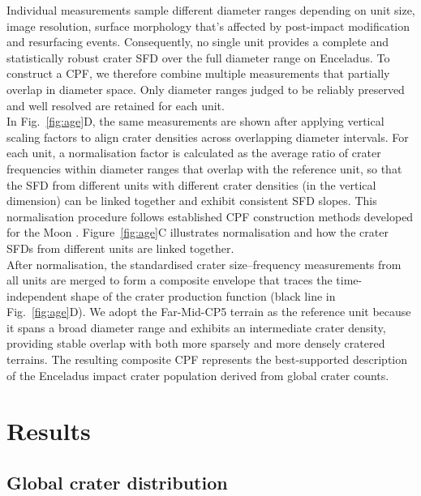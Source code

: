 \documentclass[preprint,11pt,3p,times,authoryear]{elsarticle}
\begin{document}
Individual measurements sample different diameter ranges depending on unit size, image resolution, surface morphology that's affected by post-impact modification and resurfacing events. Consequently, no single unit provides a complete and statistically robust crater SFD over the full diameter range on Enceladus. To construct a CPF, we therefore combine multiple measurements that partially overlap in diameter space. Only diameter ranges judged to be reliably preserved and well resolved are retained for each unit.\\

In Fig.~\ref{fig:age}D, the same measurements are shown after applying vertical scaling factors to align crater densities across overlapping diameter intervals. For each unit, a normalisation factor is calculated as the average ratio of crater frequencies within diameter ranges that overlap with the reference unit, so that the SFD from different units with different crater densities (in the vertical dimension) can be linked together and exhibit consistent SFD slopes. This normalisation procedure follows established CPF construction methods developed for the Moon \citep{Neukum1975, Neukum1983, Werner2005}. Figure~\ref{fig:age}C illustrates normalisation and how the crater SFDs from different units are linked together.\\

After normalisation, the standardised crater size–frequency measurements from all units are merged to form a composite envelope that traces the time-independent shape of the crater production function (black line in Fig.~\ref{fig:age}D). We adopt the Far-Mid-CP5 terrain as the reference unit because it spans a broad diameter range and exhibits an intermediate crater density, providing stable overlap with both more sparsely and more densely cratered terrains. The resulting composite CPF represents the best-supported description of the Enceladus impact crater population derived from global crater counts.

\section{Results}

\subsection{Global crater distribution}
\label{subsec:crater_dist}
\end{document}
